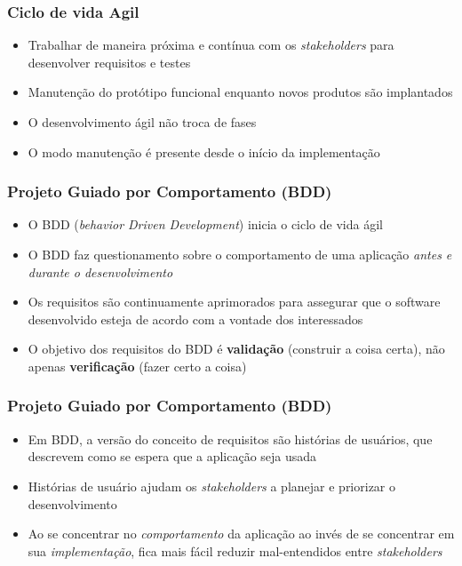 \begin{frame}
 \frametitle{Ciclo de vida Agil}
 \begin{itemize}
  \item Trabalhar de maneira próxima e contínua com os \textit{stakeholders} para desenvolver requisitos e testes
  \item Manutenção do protótipo funcional enquanto novos produtos são implantados
  \item O desenvolvimento ágil não troca de fases
  \item O modo manutenção é presente desde o início da implementação
 \end{itemize}
\end{frame}

\begin{frame}
 \frametitle{Projeto Guiado por Comportamento (BDD)}
 \begin{itemize}
  \item O BDD (\textit{behavior Driven Development}) inicia o ciclo de vida ágil
  \item O BDD faz questionamento sobre o comportamento  de uma aplicação \textit{antes e durante o desenvolvimento}
  \item Os requisitos são continuamente aprimorados para assegurar que o software desenvolvido esteja de acordo com a vontade 	dos interessados
  \item O objetivo dos requisitos do BDD é \textbf{validação} (construir a coisa certa), não apenas \textbf{verificação} (fazer certo a coisa)
 \end{itemize}
\end{frame}

\begin{frame}
 \frametitle{Projeto Guiado por Comportamento (BDD)}
 \begin{itemize}
  \item Em BDD, a versão do conceito de requisitos são histórias de usuários, que descrevem como se espera que a aplicação seja usada
  \item Histórias de usuário ajudam os \textit{stakeholders} a planejar e priorizar o desenvolvimento
  \item Ao se concentrar no \textit{comportamento} da aplicação ao invés de se concentrar em sua \textit{implementação},  fica mais fácil reduzir
  mal-entendidos entre \textit{stakeholders}
 \end{itemize}
\end{frame}


